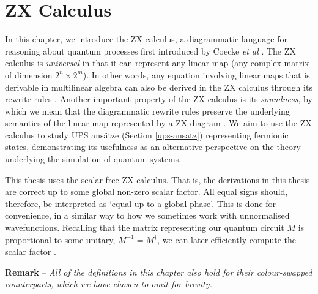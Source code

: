 \chapter{ZX Calculus}%
\label{zx-calculus}

In this chapter, we introduce the ZX calculus, a diagrammatic language for reasoning about quantum processes first introduced by Coecke \textit{et al} \cite{Coecke2011}. The ZX calculus is \textit{universal} in that it can represent any linear map (any complex matrix of dimension $2^n \times 2^m$). In other words, any equation involving linear maps that is derivable in multilinear algebra can also be derived in the ZX calculus through its rewrite rules \cite{Poor2023}. Another important property of the ZX calculus is its \textit{soundness}, by which we mean that the diagrammatic rewrite rules preserve the underlying semantics of the linear map represented by a ZX diagram \cite{Wetering2020}. We aim to use the ZX calculus to study UPS ansätze (Section \ref{ups-ansatz}) representing fermionic states, demonstrating its usefulness as an alternative perspective on the theory underlying the simulation of quantum systems.

This thesis uses the scalar-free ZX calculus. That is, the derivations in this thesis are correct up to some global non-zero scalar factor. All equal signs should, therefore, be interpreted as `equal up to a global phase'. This is done for convenience, in a similar way to how we sometimes work with unnormalised wavefunctions. Recalling that the matrix representing our quantum circuit $M$ is proportional to some unitary, $M^{-1} = M^\dagger$, we can later efficiently compute the scalar factor \cite{Wetering2020}.

\hangindent=10pt 
\textbf{Remark} -- \textit{All of the definitions in this chapter also hold for their colour-swapped counterparts, which we have chosen to omit for brevity.}

